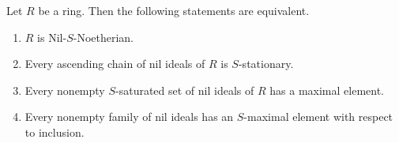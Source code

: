 \documentclass[11pt]{article}
\begin{document}
\begin{theorem}\label{j1}
	Let $R$ be  a  ring. Then the following statements are equivalent.
	\begin{enumerate}
		\item $R$ is  Nil-$S$-Noetherian.
		
		\item  Every ascending chain of nil ideals of $R$ is $S$-stationary.
		
		\item Every nonempty $S$-saturated set of  nil ideals of $R$ has a maximal element.
		
		\item Every nonempty family of nil ideals has an $S$-maximal element with respect to inclusion.
	\end{enumerate}
\end{theorem}
\end{document}
